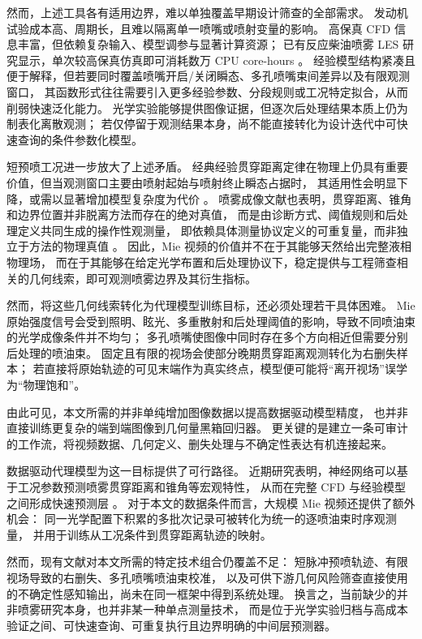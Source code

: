 然而，上述工具各有适用边界，难以单独覆盖早期设计筛查的全部需求。
发动机试验成本高、周期长，且难以隔离单一喷嘴或喷射变量的影响。
高保真 CFD 信息丰富，但依赖复杂输入、模型调参与显著计算资源；
已有反应柴油喷雾 LES 研究显示，单次较高保真仿真即可消耗数万
CPU core-hours \cite{CurtisNiemeyerSung2017,liu2020sprayreview}。
经验模型结构紧凑且便于解释，但若要同时覆盖喷嘴开启/关闭瞬态、多孔喷嘴束间差异以及有限观测窗口，
其函数形式往往需要引入更多经验参数、分段规则或工况特定拟合，从而削弱快速泛化能力。
光学实验能够提供图像证据，但逐次后处理结果本质上仍为制表化离散观测；
若仅停留于观测结果本身，尚不能直接转化为设计迭代中可快速查询的条件参数化模型。

短预喷工况进一步放大了上述矛盾。
经典经验贯穿距离定律在物理上仍具有重要价值，但当观测窗口主要由喷射起始与喷射终止瞬态占据时，
其适用性会明显下降，或需以显著增加模型复杂度为代价 \cite{HiroyasuArai1990,ZhouLiYi2021,ZhouLiLaiWei2019}。
喷雾成像文献也表明，贯穿距离、锥角和边界位置并非脱离方法而存在的绝对真值，
而是由诊断方式、阈值规则和后处理定义共同生成的操作性观测量，
即依赖具体测量协议定义的可重复量，而非独立于方法的物理真值
\cite{MagnottiGenzale2013,JohnsonNaberLee2012,ecn_liquid_penetration,ecn_liquid_penetration_accessory}。
因此，Mie 视频的价值并不在于其能够天然给出完整液相物理场，
而在于其能够在给定光学布置和后处理协议下，稳定提供与工程筛查相关的几何线索，即可观测喷雾边界及其衍生指标。

然而，将这些几何线索转化为代理模型训练目标，还必须处理若干具体困难。
Mie 原始强度信号会受到照明、眩光、多重散射和后处理阈值的影响，导致不同喷油束的光学成像条件并不均匀；
多孔喷嘴使图像中同时存在多个方向相近但需要分别后处理的喷油束。
固定且有限的视场会使部分晚期贯穿距离观测转化为右删失样本；
若直接将原始轨迹的可见末端作为真实终点，模型便可能将``离开视场''误学为``物理饱和''。

由此可见，本文所需的并非单纯增加图像数据以提高数据驱动模型精度，
也并非直接训练更复杂的端到端图像到几何量黑箱回归器。
更关键的是建立一条可审计的工作流，将视频数据、几何定义、删失处理与不确定性表达有机连接起来。

数据驱动代理模型为这一目标提供了可行路径。
近期研究表明，神经网络可以基于工况参数预测喷雾贯穿距离和锥角等宏观特性，
从而在完整 CFD 与经验模型之间形成快速预测层 \cite{VazKarathanasis2026,liu2020sprayreview}。
对于本文的数据条件而言，大规模 Mie 视频还提供了额外机会：
同一光学配置下积累的多批次记录可被转化为统一的逐喷油束时序观测量，
并用于训练从工况条件到贯穿距离轨迹的映射。

然而，现有文献对本文所需的特定技术组合仍覆盖不足：
短脉冲预喷轨迹、有限视场导致的右删失、多孔喷嘴喷油束校准，
以及可供下游几何风险筛查直接使用的不确定性感知输出，尚未在同一框架中得到系统处理。
换言之，当前缺少的并非喷雾研究本身，也并非某一种单点测量技术，
而是位于光学实验归档与高成本验证之间、可快速查询、可重复执行且边界明确的中间层预测器。

